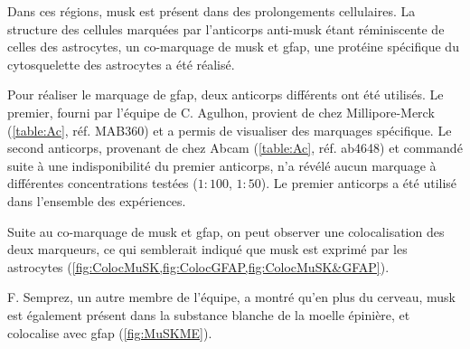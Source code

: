 \begin{figure}[h]
		\label{fig:ImmunoMusk}
	\end{figure}
	
	Dans ces régions, \gls{musk} est présent dans des prolongements cellulaires. La structure des cellules marquées par l'anticorps anti-\gls{musk} étant réminiscente de celles des astrocytes, un co-marquage de \gls{musk} et \gls{gfap}, une protéine spécifique du cytosquelette des astrocytes a été réalisé.
	
	Pour réaliser le marquage de \gls{gfap}, deux anticorps différents ont été utilisés. Le premier, fourni par l'équipe de C. Agulhon, provient de chez Millipore-Merck (\cref{table:Ac}, réf. MAB360) et a permis de visualiser des marquages spécifique. Le second anticorps, provenant de chez Abcam (\cref{table:Ac}, réf. ab4648) et commandé suite à une indisponibilité du premier anticorps, n'a révélé aucun marquage à différentes concentrations testées ($1{:}100$, $1{:}50$). Le premier anticorps a été utilisé dans l'ensemble des expériences.
	
	Suite au co-marquage de \gls{musk} et \gls{gfap}, on peut observer une colocalisation des deux marqueurs, ce qui semblerait indiqué que \gls{musk} est exprimé par les astrocytes (\cref{fig:ColocMuSK,fig:ColocGFAP,fig:ColocMuSK&GFAP}). 
	
	F. Semprez, un autre membre de l'équipe, a montré qu'en plus du cerveau, \gls{musk} est également présent dans la substance blanche de la moelle épinière, et colocalise avec \gls{gfap} (\cref{fig:MuSKME}).
	
